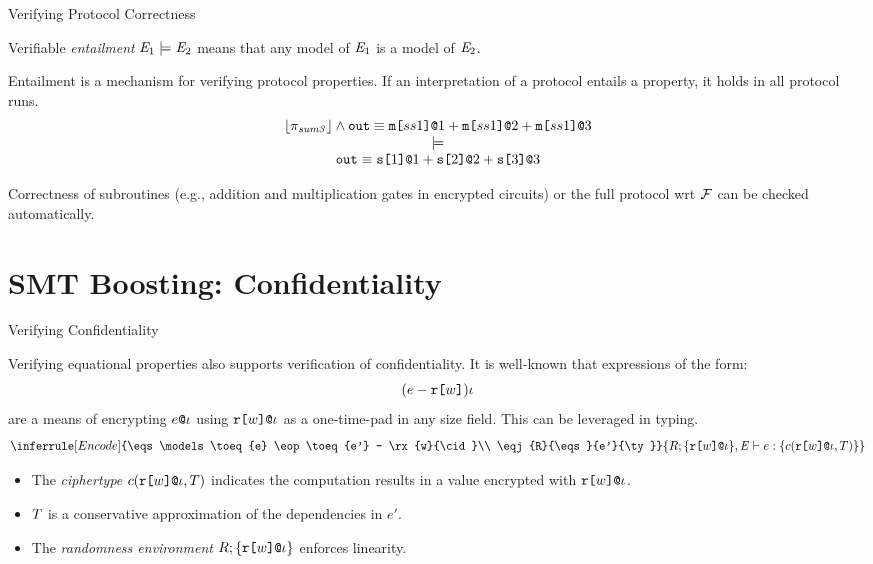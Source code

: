 \documentclass{beamer}
\newcommand{\sumthree}{\prog_{\mathit{sum3}}}
\begin{document}
\begin{frame}{Verifying Protocol Correctness}

    Verifiable \emph{entailment} $\mathit{E}_1 \models \mathit{E}_2$ means that any model of $\mathit{E}_1$ is a model
    of $\mathit{E}_2$. 

    \medskip
    Entailment is a mechanism for verifying protocol properties. If an interpretation
    of a protocol entails a property, it holds in all protocol runs. 
$$
\begin{array}{c}
  \toeq{\sumthree} \wedge \ttt{out} \eop \mx{ss1}{1} + \mx{ss1}{2} + \mx{ss1}{3}\\ \models\\
  \ttt{out} \eop \sx{1}{1} \fplus \sx{2}{2} \fplus \sx{3}{3}
\end{array}
$$

Correctness of subroutines (e.g., addition and multiplication gates in encrypted circuits)
or the full protocol wrt $\mathcal{F}$ can be checked automatically.
\end{frame}

\section{SMT Boosting: Confidentiality}

\begin{frame}{Verifying Confidentiality}

  Verifying equational properties also supports verification of confidentiality.
  It is well-known that expressions of the form:
  $$
  (e - \texttt{r[}w\texttt{]}){\iota}
  $$
  are a means of encrypting $e\texttt{@}\iota$ using $\texttt{r[}w\texttt{]}\texttt{@}\iota$ as a one-time-pad in any
  size field. This can be leveraged in typing. 
  $$    
  \inferrule[Encode]
  {\eqs \models \toeq{e} \eop \toeq{e'} - \rx{w}{\cid}\\
   \eqj{R}{\eqs}{e'}{\ty}}
  {\eqj{R;\{ \rx{w}{\cid} \}}{\eqs}{e}{\setit{\cty{\rx{w}{\cid}}{\ty}}}}
  $$
  \begin{itemize}
  \item The \emph{ciphertype} $c(\texttt{r[}w\texttt{]}\texttt{@}\iota,T)$ indicates the computation
    results in a value encrypted with $\texttt{r[}w\texttt{]}\texttt{@}\iota$.
  \item $T$ is a conservative approximation of the dependencies in $e'$.
  \item The \emph{randomness environment} $R;\{ \texttt{r[}w\texttt{]}\texttt{@}\iota \}$ enforces
    linearity.
  \end{itemize}
  
\end{frame}
\end{document}
